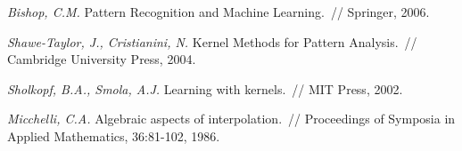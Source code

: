 \documentclass[12pt,fleqn]{article}
\begin{document}
\begin{thebibliography}{1}
    \emph{Bishop, C.M.}
    Pattern Recognition and Machine Learning.~//
    Springer, 2006.

    \emph{Shawe-Taylor, J., Cristianini, N.}
    Kernel Methods for Pattern Analysis.~//
    Cambridge University Press, 2004.

    \emph{Sholkopf, B.A., Smola, A.J.}
    Learning with kernels.~//
    MIT Press, 2002.

    \emph{Micchelli, C.A.}
    Algebraic aspects of interpolation.~//
    Proceedings of Symposia in Applied Mathematics, 36:81-102, 1986.
\end{thebibliography}
\end{document}

